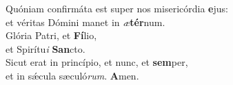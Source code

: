 \evenverse Quóniam confirmáta est super nos misericórdia \textbf{e}jus:~\*\\
\evenverse et véritas Dómini manet in \textit{æ}\textbf{tér}num.\\
\oddverse Glória Patri, et \textbf{Fí}lio,~\*\\
\oddverse et Spirítu\textit{i} \textbf{San}cto.\\
\evenverse Sicut erat in princípio, et nunc, et \textbf{sem}per,~\*\\
\evenverse et in sǽcula sæculó\textit{rum}. \textbf{A}men.\\

